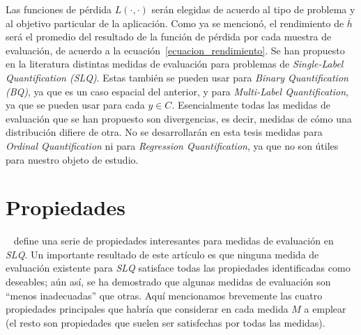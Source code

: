Las funciones de pérdida $L(\cdot, \cdot)$ serán elegidas de acuerdo al tipo de
problema y al objetivo particular de la aplicación. Como ya se mencionó, el
rendimiento de $\overline{h}$ será el promedio del resultado de la función de
pérdida por cada muestra de evaluación, de acuerdo a la
ecuación~\ref{ecuacion_rendimiento}. Se han propuesto en la literatura distintas
medidas de evaluación para problemas de {\it Single-Label Quantification (SLQ)}.
Estas también se pueden usar para {\it Binary Quantification (BQ)}, ya que es un
caso espacial del anterior, y para {\it Multi-Label Quantification}, ya que se
pueden usar para cada $y \in C$. Esencialmente todas las medidas de evaluación
que se han propuesto son divergencias, es decir, medidas de cómo una
distribución difiere de otra. No se desarrollarán en esta tesis medidas para
{\it Ordinal Quantification\/} ni para {\it Regression Quantification}, ya que
no son útiles para nuestro objeto de estudio.

\section{Propiedades}\label{evaluacion:propiedades}

~\citet{sebastiani2020evaluation} define una serie de propiedades interesantes
para medidas de evaluación en {\it SLQ}. Un importante resultado de este
artículo es que ninguna medida de evaluación existente para {\it SLQ\/}
satisface todas las propiedades identificadas como deseables; aún así, se ha
demostrado que algunas medidas de evaluación son “menos inadecuadas” que otras.
Aquí mencionamos brevemente las cuatro propiedades principales que habría que
considerar en cada medida $M$ a emplear (el resto son propiedades que suelen ser
satisfechas por todas las medidas).

